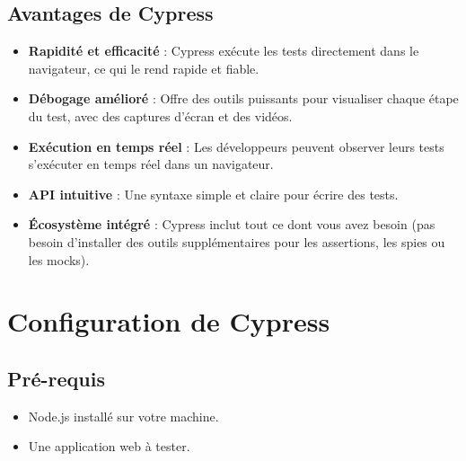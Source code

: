 \documentclass[a4paper,12pt]{article}
\begin{document}
\subsection*{Avantages de Cypress}
\begin{itemize}
    \item \textbf{Rapidité et efficacité} : Cypress exécute les tests directement dans le navigateur, ce qui le rend rapide et fiable.
    \item \textbf{Débogage amélioré} : Offre des outils puissants pour visualiser chaque étape du test, avec des captures d'écran et des vidéos.
    \item \textbf{Exécution en temps réel} : Les développeurs peuvent observer leurs tests s'exécuter en temps réel dans un navigateur.
    \item \textbf{API intuitive} : Une syntaxe simple et claire pour écrire des tests.
    \item \textbf{Écosystème intégré} : Cypress inclut tout ce dont vous avez besoin (pas besoin d'installer des outils supplémentaires pour les assertions, les spies ou les mocks).
\end{itemize}

\section*{Configuration de Cypress}

\subsection*{Pré-requis}
\begin{itemize}
    \item Node.js installé sur votre machine.
    \item Une application web à tester.
\end{itemize}
\end{document}
